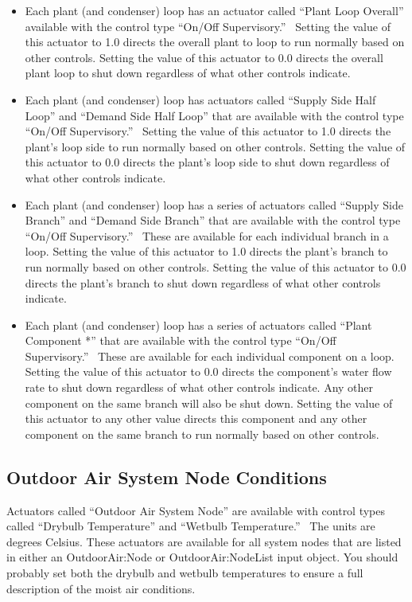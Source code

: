 \begin{itemize}
\item
  Each plant (and condenser) loop has an actuator called ``Plant Loop Overall'' available with the control type ``On/Off Supervisory.''~ Setting the value of this actuator to 1.0 directs the overall plant to loop to run normally based on other controls. Setting the value of this actuator to 0.0 directs the overall plant loop to shut down regardless of what other controls indicate.
\item
  Each plant (and condenser) loop has actuators called ``Supply Side Half Loop'' and ``Demand Side Half Loop'' that are available with the control type ``On/Off Supervisory.''~ Setting the value of this actuator to 1.0 directs the plant's loop side to run normally based on other controls. Setting the value of this actuator to 0.0 directs the plant's loop side to shut down regardless of what other controls indicate.
\item
  Each plant (and condenser) loop has a series of actuators called ``Supply Side Branch'' and ``Demand Side Branch'' that are available with the control type ``On/Off Supervisory.''~ These are available for each individual branch in a loop. Setting the value of this actuator to 1.0 directs the plant's branch to run normally based on other controls. Setting the value of this actuator to 0.0 directs the plant's branch to shut down regardless of what other controls indicate.
\item
  Each plant (and condenser) loop has a series of actuators called ``Plant Component *'' that are available with the control type ``On/Off Supervisory.''~ These are available for each individual component on a loop. Setting the value of this actuator to 0.0 directs the component's water flow rate to shut down regardless of what other controls indicate. Any other component on the same branch will also be shut down. Setting the value of this actuator to any other value directs this component and any other component on the same branch to run normally based on other controls. 
\end{itemize}

\subsection{Outdoor Air System Node Conditions}\label{outdoor-air-system-node-conditions}

Actuators called ``Outdoor Air System Node'' are available with control types called ``Drybulb Temperature'' and ``Wetbulb Temperature.''~ The units are degrees Celsius. These actuators are available for all system nodes that are listed in either an OutdoorAir:Node or OutdoorAir:NodeList input object. You should probably set both the drybulb and wetbulb temperatures to ensure a full description of the moist air conditions.

